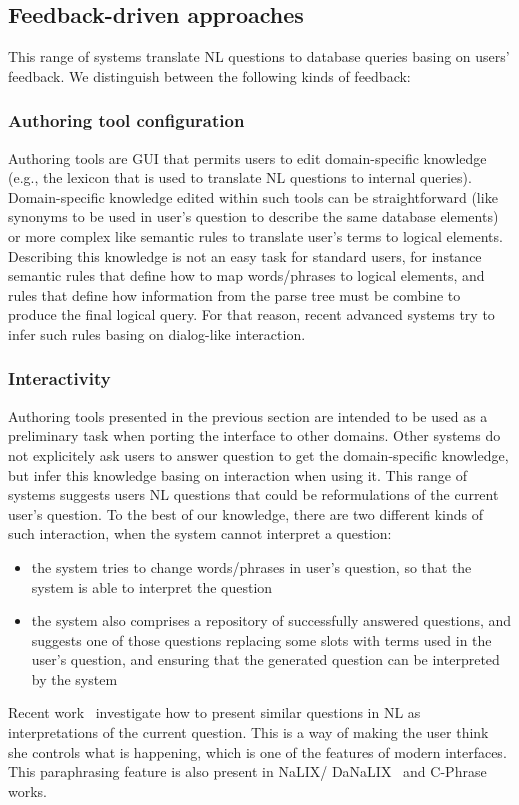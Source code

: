 \documentclass[10pt,journal,letterpaper,compsoc]{IEEEtran}
\begin{document}
\subsection{Feedback-driven approaches}
This range of systems translate NL questions to database queries basing on
users' feedback. 
We distinguish between the following kinds of feedback:


\subsubsection{Authoring tool configuration}
Authoring tools are GUI that permits users to edit domain-specific knowledge
(e.g., the lexicon that is used to translate NL questions to internal queries). 
Domain-specific knowledge edited within such tools can be straightforward (like
synonyms to be used in user's question to describe the same database elements)
or more complex like semantic rules to translate user's terms to logical
elements.
Describing this knowledge is not an easy task for standard users, for instance
semantic rules that define how to map words/phrases to logical elements, and
rules that define how information from the parse tree must be combine to
produce the final logical query.
For that reason, recent advanced systems try to infer such rules basing on
dialog-like interaction. 


\subsubsection{Interactivity}
Authoring tools presented in the previous section are intended to be used as a
preliminary task when porting the interface to other domains. 
Other systems do not explicitely ask users to answer question to get the
domain-specific knowledge, but infer this knowledge basing on interaction when
using it. 
This range of systems suggests users NL questions that could be reformulations
of the current user's question. 
To the best of our knowledge, there are two different kinds of such interaction,
when the system cannot interpret a question:
\begin{itemize}
  \item the system tries to change words/phrases in user's question, so that the
  system is able to interpret the question
  \item the system also comprises a repository of successfully answered
  questions, and suggests one of those questions replacing some slots with terms
  used in the user's question, and ensuring that the generated question can be
  interpreted by the system
\end{itemize}
Recent work~\cite{DBLP:conf/icde/KoutrikaSI10} investigate how to present
similar questions in NL as interpretations of the current question. 
This is a way of making the user think she controls what is happening, which is
one of the features of modern interfaces. 
This paraphrasing feature is also present in {\sc NaLIX}/{\sc
DaNaLIX}~\cite{Li:2005:NIN:1066157.1066281,Li:2007:DDN:1247480.1247643} and {\sc
C-Phrase}~\cite{Minock:2010:CSB:1715942.1716190} works.
\end{document}
